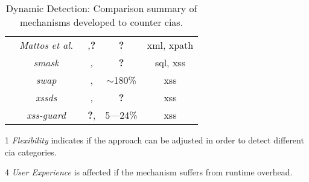 \documentclass[conference]{IEEEtran}
\newcommand{\tick}{\ding{52}}
\newcommand{\xmark}{\ding{56}}
\begin{document}
\begin{table*}
\begin{threeparttable}
\begin{small}
{\begin{tabular}{l|c|cc|c}
	& 	{\it Mattos et al.}~\cite{MSM13} & \tick,{\bf ?} &  {\bf ?} & {\sc xml}, {\sc xp}ath \\
	& 	{\it {\sc sm}ask}~\cite{JB07} & \xmark,\xmark & {\bf ?} & {\sc sql}, {\sc xss} \\
	& 	{\it {\sc swap}}~\cite{WPLKK09} & \tick,\tick & $\sim$180\% & {\sc xss} \\ 
    & 	{\it {\sc xssds}}~\cite{JEP08}  & \xmark,\xmark & {\bf ?} &  {\sc xss} \\
    & 	{\it {\sc xss-guard}}~\cite{BV08} & {\bf ?},\xmark & 5---24\% & {\sc xss} \\
	\hline
    \end{tabular}}
    \begin{tablenotes}
	\begin{footnotesize}
       \item[1] {\it Flexibility} indicates if the approach can be adjusted
	in order to detect different {\sc cia} categories.
       \item[4] {\it User Experience} is affected if the mechanism suffers
	from runtime overhead.
	\end{footnotesize}
    \end{tablenotes}
    \caption{Dynamic Detection: Comparison summary of mechanisms developed to counter {\sc cia}s.}
    \label{tab:comp2}
    \end{small}
    \end{threeparttable}
\end{table*}



\end{document}
